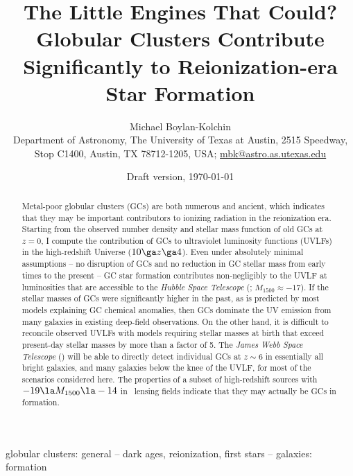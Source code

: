\documentclass[fleqn,usenatbib]{mnras}
\title[Globular clusters and high-$z$ luminosity functions]
{
The Little Engines That Could? Globular Clusters Contribute Significantly to
Reionization-era Star Formation
}
\author[M. Boylan-Kolchin]
{Michael Boylan-Kolchin\\
$\!$Department of Astronomy, The University of Texas at Austin,
2515 Speedway, Stop C1400, Austin, TX 78712-1205, USA; 
\href{mailto:mbk@astro.as.utexas.edu}{mbk@astro.as.utexas.edu}}
\date{Draft version, \today}
\begin{document}
\label{firstpage}
\pagerange{\pageref{firstpage}--\pageref{lastpage}}
\maketitle


\begin{abstract}
  Metal-poor globular clusters (GCs) are both numerous and ancient, which
  indicates that they may be important contributors to ionizing radiation in the
  reionization era. Starting from the observed number density and stellar mass
  function of old GCs at $z=0$, I compute the contribution of GCs to ultraviolet
  luminosity functions (UVLFs) in the high-redshift Universe ($10 \ga z \ga
  4$). Even under absolutely minimal assumptions -- no disruption of GCs and no
  reduction in GC stellar mass from early times to the present -- GC star
  formation contributes non-negligibly to the UVLF at luminosities that are
  accessible to the \textit{Hubble Space Telescope} (\hst;
  $M_{1500} \approx -17$). If the stellar masses of GCs were significantly
  higher in the past, as is predicted by most models explaining GC chemical
  anomalies, then GCs dominate the UV emission from many galaxies in existing
  deep-field observations. On the other hand, it is difficult to reconcile
  observed UVLFs with models requiring stellar masses at birth that exceed
  present-day stellar masses by more than a factor of 5. The \textit{James Webb
    Space Telescope} (\jwst) will be able to directly detect individual GCs at
  $z \sim 6$ in essentially all bright galaxies, and many galaxies below the
  knee of the UVLF, for most of the scenarios considered here. The properties of
  a subset of high-redshift sources with $-19 \la M_{1500} \la -14$ in \hst\
  lensing fields indicate that they may actually be GCs in formation.
\end{abstract}

\begin{keywords}
globular clusters: general -- dark ages, reionization, first stars -- galaxies: formation
\end{keywords}
\end{document}
